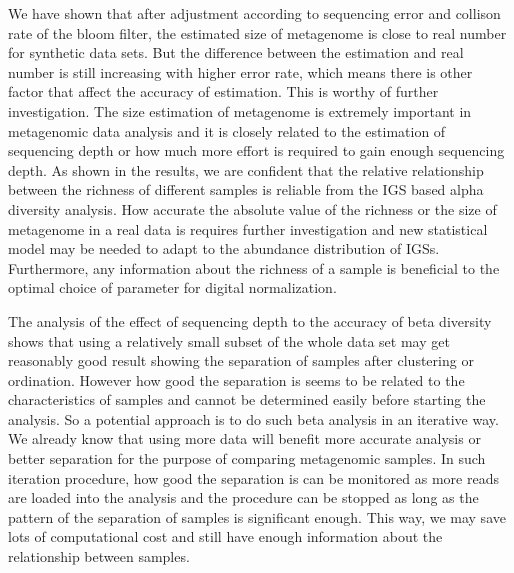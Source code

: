We have shown that after adjustment according to sequencing error and collison
rate of the bloom filter, the estimated size of metagenome is close to real
number for synthetic data sets. But the difference between the estimation and
real number is still increasing with higher error rate, which means there is
other factor that affect the accuracy of estimation. This is worthy of further
investigation. The size estimation of metagenome is extremely important in
metagenomic data analysis and it is closely related to the estimation of
sequencing depth or how much more effort is required to gain enough sequencing
depth. As shown in the results, we are confident that the relative relationship 
between the richness of different samples is reliable from the IGS based alpha
diversity analysis. How accurate the absolute value of the richness or the size
of metagenome in a real data is requires further investigation and new  
statistical model may be needed to adapt to the abundance distribution of IGSs.    
Furthermore, any information about the richness of a sample is beneficial to
the optimal choice of parameter for digital normalization.

The analysis of the effect of sequencing depth to the accuracy of beta
diversity shows that using a relatively small subset of the whole data set may
get reasonably good result showing the separation of samples after clustering
or ordination. However how good the separation is seems to be related to the
characteristics of samples and cannot be determined easily before starting the
analysis. So a potential approach is to do such beta analysis in an iterative
way. We already know that using more data will benefit more accurate analysis or better
separation for the purpose of comparing metagenomic samples. In such
iteration procedure, how good the separation is can be monitored as more reads
are loaded into the analysis and the procedure can be stopped as long as the
pattern of the separation of samples is significant enough. This way, we may
save lots of computational cost and still have enough information about the
relationship between samples. 
 
    
    
    
    
    
    

